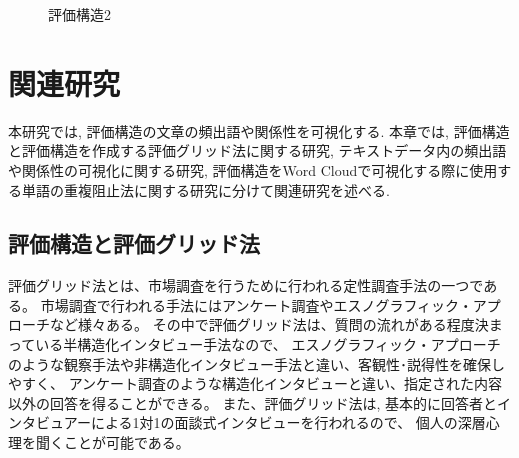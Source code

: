 \documentclass[syuuron]{kuee}
\begin{document}
		\begin{figure}
			\begin{center}
			\end{center}
			\caption{評価構造2}
	  		\label{fig:es3}
		\end{figure}

\chapter{関連研究}
	本研究では, 評価構造の文章の頻出語や関係性を可視化する. 本章では, 評価構造と評価構造を作成する評価グリッド法に関する研究, 
	テキストデータ内の頻出語や関係性の可視化に関する研究, 評価構造をWord Cloudで可視化する際に使用する単語の重複阻止法に関する研究に分けて関連研究を述べる. 
	\section{評価構造と評価グリッド法}
		評価グリッド法とは、市場調査を行うために行われる定性調査手法の一つである。
		市場調査で行われる手法にはアンケート調査やエスノグラフィック・アプローチなど様々ある。
		その中で評価グリッド法は、質問の流れがある程度決まっている半構造化インタビュー手法なので、
		エスノグラフィック・アプローチのような観察手法や非構造化インタビュー手法と違い、客観性･説得性を確保しやすく、
		アンケート調査のような構造化インタビューと違い、指定された内容以外の回答を得ることができる。
		また、評価グリッド法は, 基本的に回答者とインタビュアーによる1対1の面談式インタビューを行われるので、
		個人の深層心理を聞くことが可能である。
		
\end{document}
